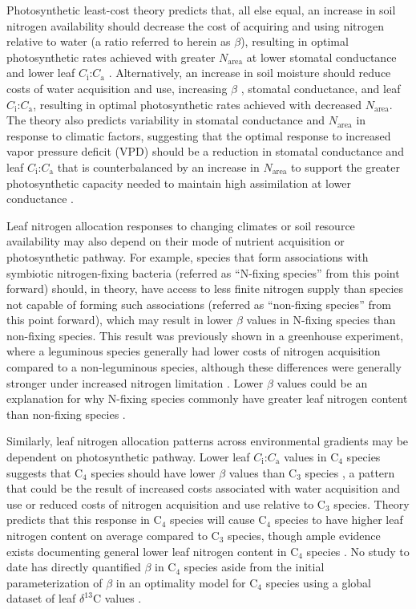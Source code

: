 Photosynthetic least-cost theory predicts that, all else equal, an increase in soil nitrogen availability should decrease the cost of acquiring and using nitrogen relative to water (a ratio referred to herein as $\beta$), resulting in optimal photosynthetic rates achieved with greater $N_\mathrm{area}$ at lower stomatal conductance and lower leaf $C_\mathrm{i}$:$C_\mathrm{a}$ . Alternatively, an increase in soil moisture should reduce costs of water acquisition and use, increasing $\beta$ , stomatal conductance, and leaf $C_\mathrm{i}$:$C_\mathrm{a}$, resulting in optimal photosynthetic rates achieved with decreased $N_\mathrm{area}$. The theory also predicts variability in stomatal conductance and $N_\mathrm{area}$ in response to climatic factors, suggesting that the optimal response to increased vapor pressure deficit (VPD) should be a reduction in stomatal conductance and leaf $C_\mathrm{i}$:$C_\mathrm{a}$ that is counterbalanced by an increase in $N_\mathrm{area}$ to support the greater photosynthetic capacity needed to maintain high assimilation at lower conductance .

Leaf nitrogen allocation responses to changing climates or soil resource availability may also depend on their mode of nutrient acquisition or photosynthetic pathway. For example, species that form associations with symbiotic nitrogen-fixing bacteria (referred as “N-fixing species” from this point forward) should, in theory, have access to less finite nitrogen supply than species not capable of forming such associations (referred as “non-fixing species” from this point forward), which may result in lower $\beta$ values in N-fixing species than non-fixing species. This result was previously shown in a greenhouse experiment, where a leguminous species generally had lower costs of nitrogen acquisition compared to a non-leguminous species, although these differences were generally stronger under increased nitrogen limitation . Lower $\beta$ values could be an explanation for why N-fixing species commonly have greater leaf nitrogen content than non-fixing species .

Similarly, leaf nitrogen allocation patterns across environmental gradients may be dependent on photosynthetic pathway. Lower leaf $C_\mathrm{i}$:$C_\mathrm{a}$ values in C$_4$ species suggests that C$_4$ species should have lower $\beta$ values than C$_3$ species , a pattern that could be the result of increased costs associated with water acquisition and use or reduced costs of nitrogen acquisition and use relative to C$_3$ species. Theory predicts that this response in C$_4$ species will cause C$_4$ species to have higher leaf nitrogen content on average compared to C$_3$ species, though ample evidence exists documenting general lower leaf nitrogen content in C$_4$ species . No study to date has directly quantified $\beta$ in C$_4$ species aside from the initial parameterization of $\beta$ in an optimality model for C$_4$ species  using a global dataset of leaf $\delta^{13}$C values .

